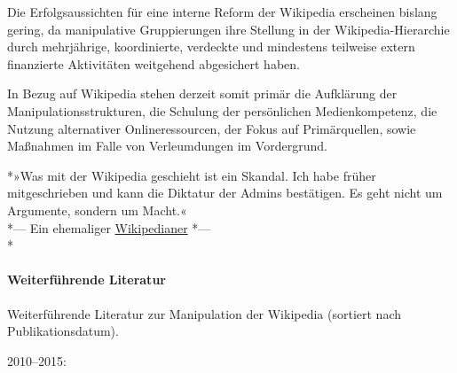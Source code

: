 Die Erfolgsaussichten für eine interne Reform der Wikipedia erscheinen
bislang gering, da manipulative Gruppierungen ihre Stellung in der
Wikipedia-Hierarchie durch mehrjährige, koordinierte, verdeckte und
mindestens teilweise extern finanzierte Aktivitäten weitgehend
abgesichert haben.

In Bezug auf Wikipedia stehen derzeit somit primär die Aufklärung der
Manipulationsstrukturen, die Schulung der persönlichen Medienkompetenz,
die Nutzung alternativer Onlineressourcen, der Fokus auf Primärquellen,
sowie Maßnahmen im Falle von Verleumdungen im Vordergrund.

*»Was mit der Wikipedia geschieht ist ein Skandal. Ich habe früher
mitgeschrieben und kann die Diktatur der Admins bestätigen. Es geht
nicht um Argumente, sondern um Macht.«\\
*--- Ein ehemaliger
\href{https://www.tichyseinblick.de/feuilleton/medien/enttarnung-eines-wiederholungstaeters-wikipedia-das-kontaminierte-lexikon/\#comment-502004}{Wikipedianer}
*---\\
*

\hypertarget{weiterfuxfchrende-literatur}{%
\paragraph{Weiterführende Literatur}\label{weiterfuxfchrende-literatur}}

Weiterführende Literatur zur Manipulation der Wikipedia (sortiert nach
Publikationsdatum).

2010--2015:


